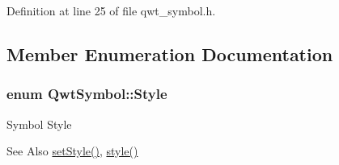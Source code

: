 Definition at line 25 of file qwt\-\_\-symbol.\-h.



\subsection{Member Enumeration Documentation}
\hypertarget{class_qwt_symbol_a62f457952470c2076962e83ef2c24d2f}{
\subsubsection[{Style}]{\setlength{\rightskip}{0pt plus 5cm}enum {\bf Qwt\-Symbol\-::\-Style}}}\label{class_qwt_symbol_a62f457952470c2076962e83ef2c24d2f}
Symbol Style \begin{DoxySeeAlso}{See Also}
\hyperlink{class_qwt_symbol_a4d3b9f3dd8c4ca034694b86372b74eb9}{set\-Style()}, \hyperlink{class_qwt_symbol_a5e5811e1a1621e617716a2a62578b507}{style()} 
\end{DoxySeeAlso}
